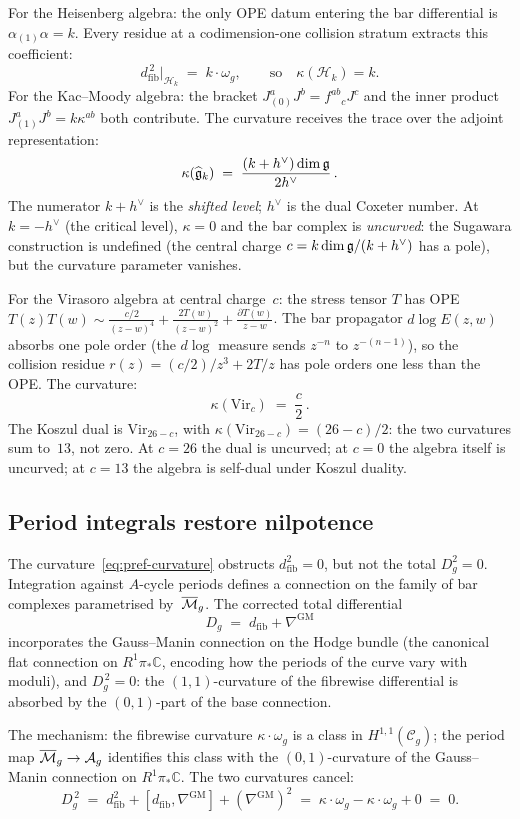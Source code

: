 For the Heisenberg algebra: the only OPE datum entering the bar
differential is $\alpha_{(1)}\alpha=k$. Every residue at a
codimension-one collision stratum extracts this coefficient:
\[
d_{\mathrm{fib}}^{\,2}\big|_{\mathcal H_k}
\;=\;
k\cdot\omega_g,
\qquad\text{so}\quad
\kappa(\mathcal H_k)=k.
\]
For the Kac--Moody algebra: the bracket
$J^a_{(0)}J^b=f^{ab}{}_{c}J^c$ and the inner product
$J^a_{(1)}J^b=k\kappa^{ab}$ both contribute. The curvature
receives the trace over the adjoint representation:
\[
\kappa(\widehat{\mathfrak{g}}_k)
\;=\;
\frac{(k+h^\vee)\dim\mathfrak{g}}{2h^\vee}\,.
\]
The numerator $k+h^\vee$ is the \emph{shifted level}; $h^\vee$ is
the dual Coxeter number. At $k=-h^\vee$ (the critical level),
$\kappa=0$ and the bar complex is \emph{uncurved}: the Sugawara
construction is undefined (the central charge
$c=k\dim\mathfrak{g}/(k+h^\vee)$ has a pole), but the curvature
parameter vanishes.

For the Virasoro algebra at central charge~$c$: the stress tensor
$T$ has OPE $T(z)T(w)\sim\frac{c/2}{(z-w)^4}
+\frac{2T(w)}{(z-w)^2}+\frac{\partial T(w)}{z-w}$.
The bar propagator $d\log E(z,w)$ absorbs one pole order
(the $d\log$ measure sends $z^{-n}$ to $z^{-(n-1)}$), so the
collision residue $r(z)=(c/2)/z^3+2T/z$ has pole orders one
less than the OPE. The curvature:
\[
\kappa(\mathrm{Vir}_c)\;=\;\frac{c}{2}\,.
\]
The Koszul dual is $\mathrm{Vir}_{26-c}$, with
$\kappa(\mathrm{Vir}_{26-c})=(26-c)/2$: the two curvatures
sum to~$13$, not zero. At $c=26$ the dual is uncurved; at
$c=0$ the algebra itself is uncurved; at $c=13$ the algebra
is self-dual under Koszul duality.

\subsection*{Period integrals restore nilpotence}

The curvature~\eqref{eq:pref-curvature} obstructs
$d_{\mathrm{fib}}^2=0$, but not the total $D_g^2=0$.
Integration against $A$-cycle periods defines a connection on the
family of bar complexes parametrised by~$\overline{\mathcal{M}}_g$.
The corrected total differential
\[
D_g\;=\;d_{\mathrm{fib}}+\nabla^{\mathrm{GM}}
\]
incorporates the Gauss--Manin connection on the Hodge bundle
(the canonical flat connection on $R^1\pi_*\mathbb C$,
encoding how the periods of the curve vary with moduli), and
$D_g^{\,2}=0$: the $(1,1)$-curvature of the fibrewise differential
is absorbed by the $(0,1)$-part of the base connection.

The mechanism: the fibrewise curvature $\kappa\cdot\omega_g$ is a
class in $H^{1,1}(\mathcal C_g)$; the period map
$\overline{\mathcal{M}}_g\to\mathcal A_g$ identifies this class with the
$(0,1)$-curvature of the Gauss--Manin connection on
$R^1\pi_*\mathbb C$. The two curvatures cancel:
\[
D_g^{\,2}
\;=\;
d_{\mathrm{fib}}^2
+[d_{\mathrm{fib}},\nabla^{\mathrm{GM}}]
+(\nabla^{\mathrm{GM}})^2
\;=\;
\kappa\cdot\omega_g-\kappa\cdot\omega_g+0
\;=\;0.
\]

